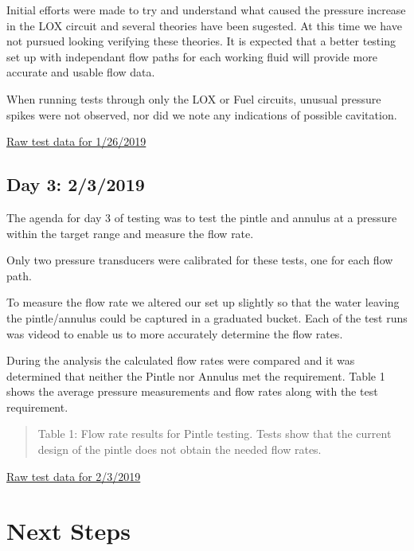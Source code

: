 \documentclass[11pt]{article}
\begin{document}
Initial efforts were made to try and understand what caused the pressure
increase in the LOX circuit and several theories have been sugested. At
this time we have not pursued looking verifying these theories. It is
expected that a better testing set up with independant flow paths for
each working fluid will provide more accurate and usable flow data.

When running tests through only the LOX or Fuel circuits, unusual
pressure spikes were not observed, nor did we note any indications of
possible cavitation.

\href{https://github.com/psas/liquid-engine-test-stand/tree/master/analysis/Pintle_V1\%20testing/Pintle\%20Test\%2001-26-2019}{Raw
test data for 1/26/2019}

\subsection{Day 3: 2/3/2019}\label{day-3-232019}

The agenda for day 3 of testing was to test the pintle and annulus at a
pressure within the target range and measure the flow rate.

Only two pressure transducers were calibrated for these tests, one for
each flow path.

To measure the flow rate we altered our set up slightly so that the
water leaving the pintle/annulus could be captured in a graduated
bucket. Each of the test runs was videod to enable us to more accurately
determine the flow rates.

During the analysis the calculated flow rates were compared and it was
determined that neither the Pintle nor Annulus met the requirement.
Table 1 shows the average pressure measurements and flow rates along
with the test requirement.

\begin{quote}
Table 1: Flow rate results for Pintle testing. Tests show that the
current design of the pintle does not obtain the needed flow rates.
\end{quote}

\href{https://github.com/psas/liquid-engine-test-stand/tree/master/analysis/Pintle_V1\%20testing/Pintle\%20Test\%2002-03-2019}{Raw
test data for 2/3/2019}

    \section{Next Steps}\label{next-steps}
\end{document}
